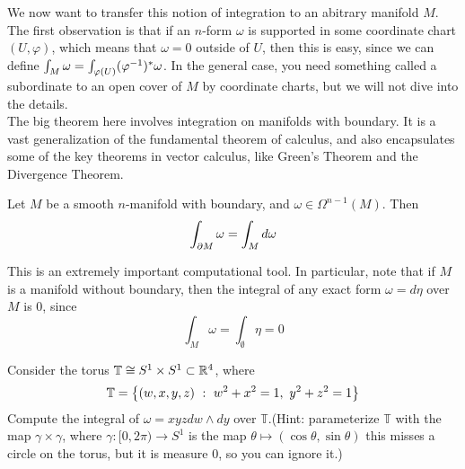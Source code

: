 We now want to transfer this notion of integration to an abitrary manifold $M$.
The first observation is that if an $n$-form $\omega$ is supported in some coordinate chart
$(U,\varphi)$, which means that $\omega = 0$ outside of $U$, then this is easy,
since we can define $\int_M \omega = \int_{\varphi(U)} (\varphi^{-1})^*\omega$.
In the general case, you need something called a  subordinate
to an open cover of $M$ by coordinate charts, but we will not dive into the details. \\

The big theorem here involves integration on manifolds with boundary. It is a
vast generalization of the fundamental theorem of calculus, and also encapsulates
some of the key theorems in vector calculus, like Green's Theorem and the Divergence
Theorem.
%
\begin{thm} 
Let $M$ be a smooth $n$-manifold with boundary, and $\omega \in \Omega^{n-1}(M)$.
Then
$$\int_{\partial M} \omega = \int_M d\omega$$
\end{thm}
%
This is an extremely important computational tool. In particular, note that if $M$
is a manifold without boundary, then the integral of any exact form $\omega = d\eta$
over $M$ is $0$, since
$$\int_M \omega = \int_\emptyset \eta = 0 $$
%
\begin{exer}
Consider the torus $\mathbb{T} \cong S^1 \times S^1 \subset \mathbb{R}^4$, where
$$\mathbb{T} = \left\lbrace (w,x,y,z) ~:~ w^2 + x^2 = 1, ~ y^2 + z^2 = 1 \right\rbrace $$
Compute the integral of $\omega = xyz dw \wedge dy$ over $\mathbb{T}$.(Hint:
parameterize $\mathbb{T}$ with the map $\gamma \times \gamma$, where
$\gamma : [0,2\pi) \to S^1$ is the map $\theta \mapsto (\cos\theta,\sin\theta)$
this misses a circle on the torus, but it is measure $0$, so you can ignore it.)
\end{exer}
%
